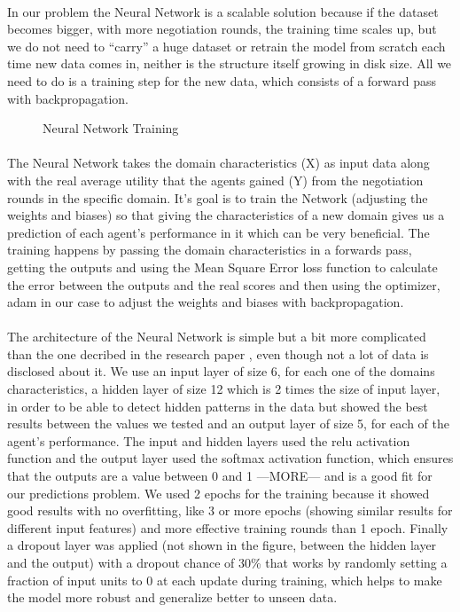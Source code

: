  \paragraph{}
 In our problem the Neural Network 
 is a scalable solution because if the dataset becomes bigger, with more negotiation rounds, 
 the training time scales up, but we do not need to “carry” a huge dataset or retrain the model from scratch each time new data comes in, 
  neither is the structure itself growing in disk size. All we need to do is a training step for the new data, which consists of a forward pass with backpropagation.
\begin{figure}[H]
\centering
\captionsetup{justification=centering}
\caption{Neural Network Training}
\label{fig:NeuralNetworkTraining}
\end{figure}


\paragraph{}
 The Neural Network takes the domain characteristics (X) as input data along with the real average utility that the agents gained (Y) from the negotiation rounds in the specific domain. It’s goal is to train the Network (adjusting the weights and biases) so that giving the characteristics of a new domain gives us a prediction of each agent’s performance in it which can be very beneficial.  
 The training happens by passing the domain characteristics in a forwards pass, getting the outputs and using the Mean Square Error loss function to calculate the error between the outputs and the real scores and then using the optimizer, adam in our case to adjust the weights and biases with backpropagation.
 \paragraph{}
 

The architecture of the Neural Network is simple but a bit more complicated than the one decribed in the research paper \cite{meta_agent_paper}, even though not a lot of data is disclosed about it.
 We use an input layer of size 6, for each one of the domains characteristics, 
 a hidden layer of size 12 which is 2 times the size of input layer, in order to be able to detect hidden patterns in the data but showed 
 the best results between the values we tested and an output layer of size 5, for each of the agent's performance.  
 The input and hidden layers used the relu activation function and the output layer used the softmax activation function, which ensures that the outputs are a value between 0 and 1 —MORE— and is a good fit for our predictions problem. We used 2 epochs for the training because it showed good results with no overfitting, like 3 or more epochs (showing similar results for different input features) and
  more effective training rounds than 1 epoch. Finally a dropout layer was applied (not shown in the figure, between the hidden layer and the output) with a dropout chance of 30\% that works by 
  randomly setting a fraction of input units to 0 at each update during training, which helps to make the model more robust and generalize better to unseen data. 
